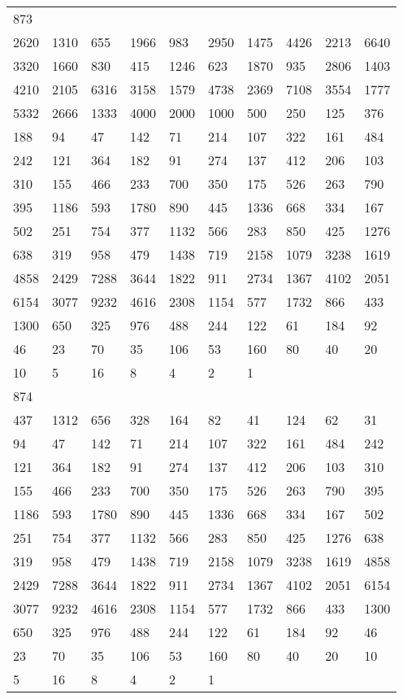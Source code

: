 \begin{longtable}{*{10}{l}}
873&&&&&&&&&\\
2620& 1310& 655& 1966& 983& 2950& 1475& 4426& 2213& 6640\\
3320& 1660& 830& 415& 1246& 623& 1870& 935& 2806& 1403\\
4210& 2105& 6316& 3158& 1579& 4738& 2369& 7108& 3554& 1777\\
5332& 2666& 1333& 4000& 2000& 1000& 500& 250& 125& 376\\
188& 94& 47& 142& 71& 214& 107& 322& 161& 484\\
242& 121& 364& 182& 91& 274& 137& 412& 206& 103\\
310& 155& 466& 233& 700& 350& 175& 526& 263& 790\\
395& 1186& 593& 1780& 890& 445& 1336& 668& 334& 167\\
502& 251& 754& 377& 1132& 566& 283& 850& 425& 1276\\
638& 319& 958& 479& 1438& 719& 2158& 1079& 3238& 1619\\
4858& 2429& 7288& 3644& 1822& 911& 2734& 1367& 4102& 2051\\
6154& 3077& 9232& 4616& 2308& 1154& 577& 1732& 866& 433\\
1300& 650& 325& 976& 488& 244& 122& 61& 184& 92\\
46& 23& 70& 35& 106& 53& 160& 80& 40& 20\\
10& 5& 16& 8& 4& 2& 1& \\

874&&&&&&&&&\\
437& 1312& 656& 328& 164& 82& 41& 124& 62& 31\\
94& 47& 142& 71& 214& 107& 322& 161& 484& 242\\
121& 364& 182& 91& 274& 137& 412& 206& 103& 310\\
155& 466& 233& 700& 350& 175& 526& 263& 790& 395\\
1186& 593& 1780& 890& 445& 1336& 668& 334& 167& 502\\
251& 754& 377& 1132& 566& 283& 850& 425& 1276& 638\\
319& 958& 479& 1438& 719& 2158& 1079& 3238& 1619& 4858\\
2429& 7288& 3644& 1822& 911& 2734& 1367& 4102& 2051& 6154\\
3077& 9232& 4616& 2308& 1154& 577& 1732& 866& 433& 1300\\
650& 325& 976& 488& 244& 122& 61& 184& 92& 46\\
23& 70& 35& 106& 53& 160& 80& 40& 20& 10\\
5& 16& 8& 4& 2& 1& \\


\end{longtable}
